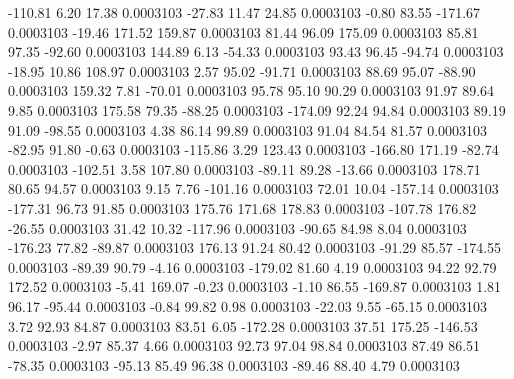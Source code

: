      -110.81        6.20       17.38     0.0003103
      -27.83       11.47       24.85     0.0003103
       -0.80       83.55     -171.67     0.0003103
      -19.46      171.52      159.87     0.0003103
       81.44       96.09      175.09     0.0003103
       85.81       97.35      -92.60     0.0003103
      144.89        6.13      -54.33     0.0003103
       93.43       96.45      -94.74     0.0003103
      -18.95       10.86      108.97     0.0003103
        2.57       95.02      -91.71     0.0003103
       88.69       95.07      -88.90     0.0003103
      159.32        7.81      -70.01     0.0003103
       95.78       95.10       90.29     0.0003103
       91.97       89.64        9.85     0.0003103
      175.58       79.35      -88.25     0.0003103
     -174.09       92.24       94.84     0.0003103
       89.19       91.09      -98.55     0.0003103
        4.38       86.14       99.89     0.0003103
       91.04       84.54       81.57     0.0003103
      -82.95       91.80       -0.63     0.0003103
     -115.86        3.29      123.43     0.0003103
     -166.80      171.19      -82.74     0.0003103
     -102.51        3.58      107.80     0.0003103
      -89.11       89.28      -13.66     0.0003103
      178.71       80.65       94.57     0.0003103
        9.15        7.76     -101.16     0.0003103
       72.01       10.04     -157.14     0.0003103
     -177.31       96.73       91.85     0.0003103
      175.76      171.68      178.83     0.0003103
     -107.78      176.82      -26.55     0.0003103
       31.42       10.32     -117.96     0.0003103
      -90.65       84.98        8.04     0.0003103
     -176.23       77.82      -89.87     0.0003103
      176.13       91.24       80.42     0.0003103
      -91.29       85.57     -174.55     0.0003103
      -89.39       90.79       -4.16     0.0003103
     -179.02       81.60        4.19     0.0003103
       94.22       92.79      172.52     0.0003103
       -5.41      169.07       -0.23     0.0003103
       -1.10       86.55     -169.87     0.0003103
        1.81       96.17      -95.44     0.0003103
       -0.84       99.82        0.98     0.0003103
      -22.03        9.55      -65.15     0.0003103
        3.72       92.93       84.87     0.0003103
       83.51        6.05     -172.28     0.0003103
       37.51      175.25     -146.53     0.0003103
       -2.97       85.37        4.66     0.0003103
       92.73       97.04       98.84     0.0003103
       87.49       86.51      -78.35     0.0003103
      -95.13       85.49       96.38     0.0003103
      -89.46       88.40        4.79     0.0003103
